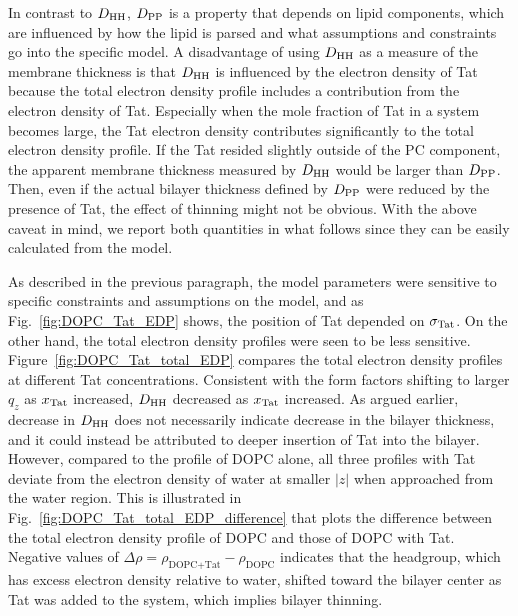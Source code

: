 In contrast to $D_\textrm{HH}$, $D_\textrm{PP}$ is a property that
depends on lipid components, which are influenced by how the lipid is parsed 
and what assumptions and constraints go into the specific model.
A disadvantage of using $D_\textrm{HH}$ as a measure of the membrane thickness is
that $D_\textrm{HH}$ is influenced by the electron density of Tat because 
the total electron density profile includes a contribution from the electron density of Tat. 
Especially when the mole fraction of Tat in a system becomes large, 
the Tat electron density contributes significantly to the total electron 
density profile. If the Tat resided slightly 
outside of the PC component, the apparent membrane thickness measured by $D_\textrm{HH}$
would be larger than $D_\textrm{PP}$. Then, even if the actual bilayer thickness defined by $D_\textrm{PP}$ 
were reduced by the presence of Tat, the effect of thinning might not be obvious. 
With the above caveat in mind, we report both quantities in what follows
since they can be easily calculated from the model.

As described in the previous paragraph, the model parameters were sensitive to 
specific constraints and assumptions on the model, and as Fig.~\ref{fig:DOPC_Tat_EDP}
shows, the position of Tat depended on $\sigma_\textrm{Tat}$. On the other hand,
the total electron density profiles were seen to be less sensitive. 
Figure~\ref{fig:DOPC_Tat_total_EDP} compares the total electron density profiles
at different Tat concentrations. Consistent with the form factors shifting 
to larger $q_z$ as $x_\textrm{Tat}$ increased, $D_\textrm{HH}$ decreased as $x_\textrm{Tat}$ increased.
As argued earlier, decrease in $D_\textrm{HH}$ does not necessarily indicate decrease
in the bilayer thickness, and it could instead be attributed to deeper insertion
of Tat into the bilayer. However, compared to the profile of DOPC alone,
all three profiles with Tat deviate from the electron density of water 
at smaller $|z|$ when approached from the water region. This is illustrated 
in Fig.~\ref{fig:DOPC_Tat_total_EDP_difference} that plots the difference 
between the total electron density profile of DOPC and those of DOPC with Tat.
Negative values of $\Delta\rho = \rho_\text{DOPC+Tat} - \rho_\text{DOPC}$
indicates that the headgroup, which has excess electron density relative to
water, shifted toward the bilayer center as Tat was added to the system,
which implies bilayer thinning. 


